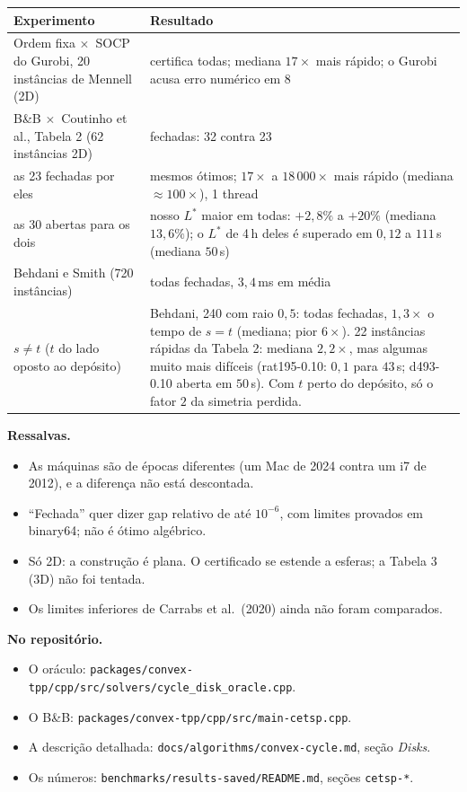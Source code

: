 \documentclass[11pt]{article}
\theoremstyle{plain}
\theoremstyle{remark}
\newcommand{\vez}{\ensuremath{\times}}
\begin{document}
\begin{center}
\small
\renewcommand{\arraystretch}{1.25}
\begin{tabular}{@{}p{5.6cm}p{10.0cm}@{}}
\toprule
Experimento & Resultado \\
\midrule
Ordem fixa \vez\ SOCP do Gurobi, 20 instâncias de Mennell (2D) &
  certifica todas; mediana $17\vez$ mais rápido; o Gurobi acusa erro numérico em 8 \\
B\&B \vez\ Coutinho et al., Tabela 2 (62 instâncias 2D) & fechadas: 32 contra 23 \\
\quad as 23 fechadas por eles &
  mesmos ótimos; $17\vez$ a $18\,000\vez$ mais rápido (mediana $\approx100\vez$), 1 thread \\
\quad as 30 abertas para os dois &
  nosso $L^\ast$ maior em todas: $+2{,}8\%$ a $+20\%$ (mediana $13{,}6\%$); o $L^\ast$ de 4\,h
  deles é superado em $0{,}12$ a $111$\,s (mediana $50$\,s) \\
Behdani e Smith (720 instâncias) & todas fechadas, $3{,}4$\,ms em média \\
$s\neq t$ ($t$ do lado oposto ao depósito) &
  Behdani, 240 com raio $0{,}5$: todas fechadas, $1{,}3\vez$ o tempo de $s=t$ (mediana; pior
  $6\vez$). 22 instâncias rápidas da Tabela 2: mediana $2{,}2\vez$, mas algumas muito mais
  difíceis (rat195-0.10: $0{,}1$ para $43$\,s; d493-0.10 aberta em $50$\,s). Com $t$ perto do
  depósito, só o fator $2$ da simetria perdida. \\
\bottomrule
\end{tabular}
\end{center}

\textbf{Ressalvas.}
\begin{itemize}
  \item As máquinas são de épocas diferentes (um Mac de 2024 contra um i7 de 2012), e a
    diferença não está descontada.
  \item ``Fechada'' quer dizer gap relativo de até $10^{-6}$, com limites provados em
    binary64; não é ótimo algébrico.
  \item Só 2D: a construção é plana. O certificado se estende a esferas; a Tabela 3 (3D) não
    foi tentada.
  \item Os limites inferiores de Carrabs et al.~(2020) ainda não foram comparados.
\end{itemize}

\textbf{No repositório.}
\begin{itemize}
  \item O oráculo: \texttt{packages/convex-tpp/cpp/src/solvers/cycle\_disk\_oracle.cpp}.
  \item O B\&B: \texttt{packages/convex-tpp/cpp/src/main-cetsp.cpp}.
  \item A descrição detalhada: \texttt{docs/algorithms/convex-cycle.md}, seção \emph{Disks}.
  \item Os números: \texttt{benchmarks/results-saved/README.md}, seções \texttt{cetsp-*}.
\end{itemize}
\end{document}
